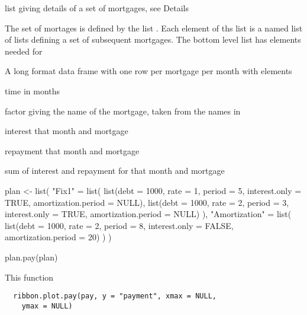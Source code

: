 \documentclass[a4paper]{book}
\begin{document}
%
\begin{Arguments}
\begin{ldescription}
\item[\code{plan}] list giving details of a set of mortgages,
see Details
\end{ldescription}
\end{Arguments}
%
\begin{Details}\relax
The set of mortages is defined by the list .
Each element of ths list is a named list of lists
defining a set of subsequent mortgages. The bottom level
list has elements needed for 
\end{Details}
%
\begin{Value}
A long format data frame with one row per mortgage per
month with elements \begin{ldescription}
\item[\code{month}] time in months
\item[\code{mortgage}] factor giving the name of the mortgage,
taken from the names in 
\item[\code{interest}] interest that month and mortgage
\item[\code{repayment}] repayment that month and mortgage
\item[\code{payment}] sum of interest and repayment for that
month and mortgage
\end{ldescription}
\end{Value}
%
\begin{Examples}
\begin{ExampleCode}
plan <- list(
 "Fix1" = list(
   list(debt = 1000, rate = 1, period = 5, interest.only = TRUE, amortization.period = NULL),
   list(debt = 1000, rate = 2, period = 3, interest.only = TRUE, amortization.period = NULL)
 ),
 "Amortization" = list(
   list(debt = 1000, rate = 2, period = 8, interest.only = FALSE, amortization.period = 20)
 )
)

plan.pay(plan)
\end{ExampleCode}
\end{Examples}
%
\begin{Description}\relax
This function
\end{Description}
%
\begin{Usage}
\begin{verbatim}
  ribbon.plot.pay(pay, y = "payment", xmax = NULL,
    ymax = NULL)
\end{verbatim}
\end{Usage}
\end{document}
